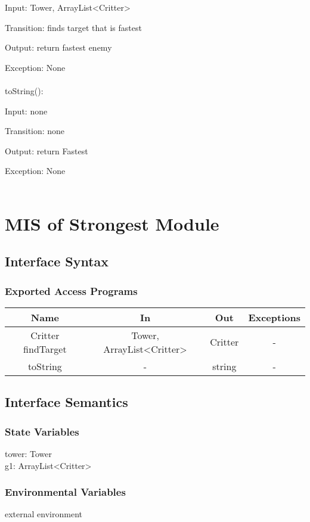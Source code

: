 \documentclass[12,english]{article}
\begin{document}
		Input: Tower, ArrayList<Critter>
		
		Transition: finds target that is fastest
		
		Output: return fastest enemy
		
		Exception: None\\
		\\
		toString():
		
		Input: none
		
		Transition: none
		
		Output: return Fastest
		
		Exception: None\\
		\\
\section{MIS of Strongest Module}
	\subsection{Interface Syntax}
		\subsubsection{Exported Access Programs}
		
	\begin{tabular}[pos]{|c|c|c|c|}
	\hline
	\textbf{Name}& \textbf{In} & \textbf{Out} & \textbf{Exceptions} \\ 
	\hline
	Critter findTarget & Tower, ArrayList<Critter> & Critter & - \\ \hline
	toString & - & string & - \\ \hline
					
	\end{tabular}		
		
	\subsection{Interface Semantics}
		\subsubsection{State Variables}
		tower: Tower\\
	    g1: ArrayList<Critter>\\
		\subsubsection{Environmental Variables}
		\color{red} external environment \color{black}
\end{document}

